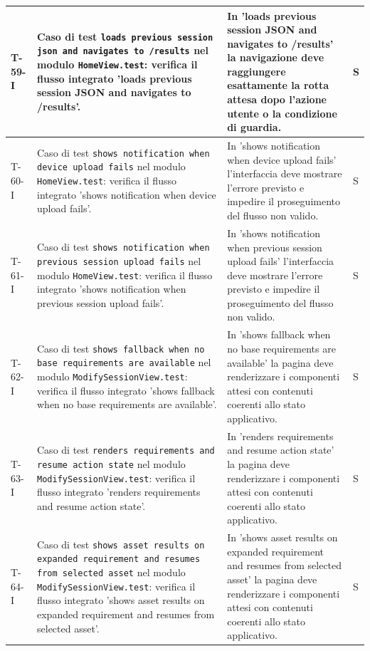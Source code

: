 \documentclass[a4paper,12pt]{article}
\begin{document}
{{\begin{longtable}{|>{\RaggedRight\arraybackslash}p{1.55cm}|>{\RaggedRight\arraybackslash}p{8.0cm}|>{\RaggedRight\arraybackslash}p{4.6cm}|>{\RaggedRight\arraybackslash}p{1.2cm}|}
        \hline
        T-59-I & Caso di test \texttt{loads previous session json and navigates to /results} nel modulo \texttt{HomeView.test}: verifica il flusso integrato 'loads previous session JSON and navigates to /results'. & In 'loads previous session JSON and navigates to /results' la navigazione deve raggiungere esattamente la rotta attesa dopo l'azione utente o la condizione di guardia. & S \\
        \hline
        T-60-I & Caso di test \texttt{shows notification when device upload fails} nel modulo \texttt{HomeView.test}: verifica il flusso integrato 'shows notification when device upload fails'. & In 'shows notification when device upload fails' l'interfaccia deve mostrare l'errore previsto e impedire il proseguimento del flusso non valido. & S \\
        \hline
        T-61-I & Caso di test \texttt{shows notification when previous session upload fails} nel modulo \texttt{HomeView.test}: verifica il flusso integrato 'shows notification when previous session upload fails'. & In 'shows notification when previous session upload fails' l'interfaccia deve mostrare l'errore previsto e impedire il proseguimento del flusso non valido. & S \\
        \hline
        T-62-I & Caso di test \texttt{shows fallback when no base requirements are available} nel modulo \texttt{ModifySessionView.test}: verifica il flusso integrato 'shows fallback when no base requirements are available'. & In 'shows fallback when no base requirements are available' la pagina deve renderizzare i componenti attesi con contenuti coerenti allo stato applicativo. & S \\
        \hline
        T-63-I & Caso di test \texttt{renders requirements and resume action state} nel modulo \texttt{ModifySessionView.test}: verifica il flusso integrato 'renders requirements and resume action state'. & In 'renders requirements and resume action state' la pagina deve renderizzare i componenti attesi con contenuti coerenti allo stato applicativo. & S \\
        \hline
        T-64-I & Caso di test \texttt{shows asset results on expanded requirement and resumes from selected asset} nel modulo \texttt{ModifySessionView.test}: verifica il flusso integrato 'shows asset results on expanded requirement and resumes from selected asset'. & In 'shows asset results on expanded requirement and resumes from selected asset' la pagina deve renderizzare i componenti attesi con contenuti coerenti allo stato applicativo. & S \\

\end{longtable}}}
\end{document}
